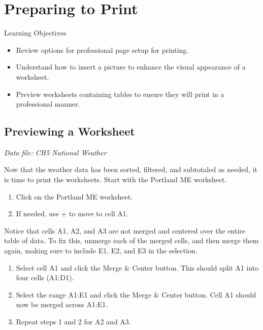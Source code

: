 \section{Preparing to Print}

\begin{center}
	\begin{objbox}{Learning Objectives}
		\begin{itemize}
			\setlength{\itemsep}{0pt}
			\setlength{\parskip}{0pt}
			\setlength{\parsep}{0pt}

			\item Review options for professional page setup for printing.
			\item Understand how to insert a picture to enhance the visual appearance of a worksheet.
			\item Preview worksheets containing tables to ensure they will print in a professional manner.
			
		\end{itemize}
	\end{objbox}
\end{center}

\subsection{Previewing a Worksheet}

\textit{Data file: CH5 National Weather}

Now that the weather data has been sorted, filtered, and subtotaled as needed, it is time to print the worksheets. Start with the Portland ME worksheet.

\begin{enumerate}
	\item Click on the Portland ME worksheet. 
	\item If needed, use + to move to cell A1.
\end{enumerate}

Notice that cells A1, A2, and A3 are not merged and centered over the entire table of data. To fix this, unmerge each of the merged cells, and then merge them again, making sure to include E1, E2, and E3 in the selection.

\begin{enumerate}
	\item Select cell A1 and click the Merge \& Center button. This should split A1 into four cells (A1:D1).
	\item Select the range A1:E1 and click the Merge \& Center button. Cell A1 should now be merged across A1:E1.
	\item Repeat steps 1 and 2 for A2 and A3.
\end{enumerate}

